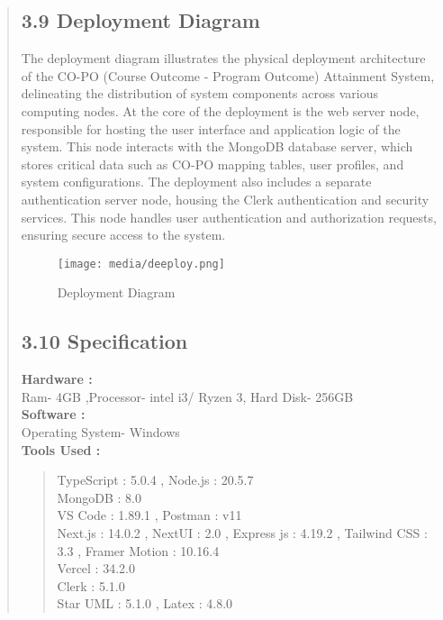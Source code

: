 \documentclass[12pt]{report}
\begin{document}
\begin{quote}
		\subsection{3.9 Deployment Diagram}
		\hspace{1cm}The deployment diagram illustrates the physical deployment architecture of the CO-PO (Course Outcome - Program Outcome) Attainment System, delineating the distribution of system components across various computing nodes. At the core of the deployment is the web server node, responsible for hosting the user interface and application logic of the system. This node interacts with the MongoDB database server, which stores critical data such as CO-PO mapping tables, user profiles, and system configurations. The deployment also includes a separate authentication server node, housing the Clerk authentication and security services. This node handles user authentication and authorization requests, ensuring secure access to the system. 
		\begin{figure}
			\centering
			\texttt{[image: media/deeploy.png]}\\
			\caption{Deployment Diagram}
		\end{figure}
		\clearpage
		
		
		\subsection{3.10 Specification}
		\textbf{Hardware : }\\
		Ram- 4GB ,Processor- intel i3/ Ryzen 3, Hard Disk- 256GB\\
		\vspace{0.3cm}
		\textbf{Software : }\\
		Operating System- Windows\\
		\vspace{0.3cm}
		\textbf{Tools Used : }\\
		\begin{quote}
			\textbf{}TypeScript : 5.0.4  , Node.js : 20.5.7 \\
			\vspace{1ex}
			\textbf{}MongoDB : 8.0\\
			\vspace{1ex}
			\textbf{}VS Code : 1.89.1 , Postman : v11 \\
			\vspace{1ex}
			\textbf{}Next.js : 14.0.2 , NextUI : 2.0 , Express js : 4.19.2 ,\vspace{1ex} Tailwind CSS : 3.3 , Framer Motion : 10.16.4\\
			\vspace{1ex}
			\textbf{}Vercel : 34.2.0\\
			\vspace{1ex}
			\textbf{}Clerk : 5.1.0\\
			\vspace{1ex}
			\textbf{}Star UML : 5.1.0 , Latex : 4.8.0\\
		\end{quote}
	\end{quote}
	\clearpage
	
\end{document}
